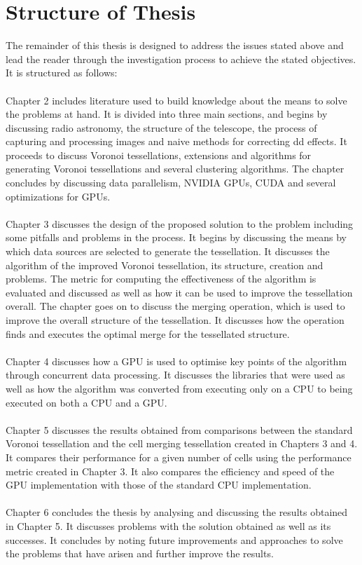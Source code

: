 \section{Structure of Thesis}
The remainder of this thesis is designed to address the issues stated above and lead the reader through the investigation process to achieve the stated objectives. It is structured as follows:
\\
\\
Chapter 2 includes literature used to build knowledge about the means to solve the problems at hand. It is divided into three main sections, and begins by discussing radio astronomy, the structure of the telescope, the process of capturing and processing images and naive methods for correcting \gls{dd} effects. It proceeds to discuss Voronoi tessellations, extensions and algorithms for generating Voronoi tessellations and several clustering algorithms. The chapter concludes by discussing data parallelism, NVIDIA GPUs, CUDA and several optimizations for GPUs.
\\
\\
Chapter 3 discusses the design of the proposed solution to the problem including some pitfalls and problems in the process. It begins by discussing the means by which data sources are selected to generate the tessellation. It discusses the algorithm of the improved Voronoi tessellation, its structure, creation and problems. The metric for computing the effectiveness of the algorithm is evaluated and discussed as well as how it can be used to improve the tessellation overall. The chapter goes on to discuss the merging operation, which is used to improve the overall structure of the tessellation. It discusses how the operation finds and executes the optimal merge for the tessellated structure.
\\
\\
Chapter 4 discusses how a GPU is used to optimise key points of the algorithm through concurrent data processing. It discusses the libraries that were used as well as how the algorithm was converted from executing only on a CPU to being executed on both a CPU and a GPU.
\\
\\
Chapter 5 discusses the results obtained from comparisons between the standard Voronoi tessellation and the cell merging tessellation created in Chapters 3 and 4. It compares their performance for a given number of cells using the performance metric created in Chapter 3. It also compares the efficiency and speed of the GPU implementation with those of the standard CPU implementation.
\\
\\
Chapter 6 concludes the thesis by analysing and discussing the results obtained in Chapter 5. It discusses problems with the solution obtained as well as its successes. It concludes by noting future improvements and approaches to solve the problems that have arisen and further improve the results.
